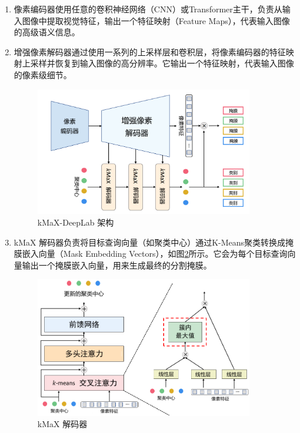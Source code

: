 \begin{enumerate}
	\item 像素编码器使用任意的卷积神经网络（CNN）或Transformer主干，负责从输入图像中提取视觉特征，输出一个特征映射（Feature Maps），代表输入图像的高级语义信息。
	\item 增强像素解码器通过使用一系列的上采样层和卷积层，将像素编码器的特征映射上采样并恢复到输入图像的高分辨率。它输出一个特征映射，代表输入图像的像素级细节。
	\begin{figure}[htbp]
		\centering
		\includegraphics[width=0.9\textwidth]{figures/kmax_deeplab.png}
		\caption{kMaX-DeepLab 架构}
		\label{fig:kmaxdeeplab}
	\end{figure}
	\item kMaX 解码器负责将目标查询向量（如聚类中心）通过K-Means聚类转换成掩膜嵌入向量（Mask Embedding Vectors），如图\ref{fig:kmaxdecoder}\cite{kmeans_mask_transformer}所示。它会为每个目标查询向量输出一个掩膜嵌入向量，用来生成最终的分割掩膜。
	\begin{figure}[htbp]
		\centering
		\includegraphics[width=0.9\textwidth]{figures/kmax_decoder.png}
		\caption{kMaX 解码器}
		\label{fig:kmaxdecoder}
	\end{figure}
\end{enumerate}

